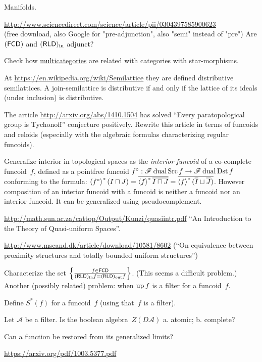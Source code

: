 \documentclass{amsart}
\begin{document}
Manifolds.

\url{http://www.sciencedirect.com/science/article/pii/0304397585900623}\\
(free download, also Google for "pre-adjunction", also "semi" instead of "pre") Are $(\mathsf{FCD})$ and $(\mathsf{RLD})_{\mathrm{in}}$ adjunct?

Check how \href{http://ncatlab.org/nlab/show/multicategory}{multicategories}
are related with categories with star-morphisms.

At \url{https://en.wikipedia.org/wiki/Semilattice} they are defined distributive
semilattices. A join-semilattice is distributive if and only if the lattice of its ideals (under inclusion) is distributive.

The article \url{http://arxiv.org/abs/1410.1504} has solved ``Every paratopological group is Tychonoff'' conjecture positively.
Rewrite this article in terms of funcoids and reloids (especially with the algebraic formulas characterizing regular funcoids).

Generalize interior in topological spaces as the \emph{interior funcoid} of a co-complete funcoid~$f$, defined as a pointfree funcoid
$f^\circ: \mathscr{F}\operatorname{dual}\operatorname{Src} f \rightarrow \mathscr{F}\operatorname{dual}\operatorname{Dst} f$ conforming to the formula:
$\left\langle f^{\circ}\right\rangle ^{\ast} (I \sqcap J) = \overline{\left\langle f\right\rangle ^{\ast} \overline{I \sqcap J}} = \overline{\left\langle f\right\rangle ^{\ast} ( \overline{I} \sqcup \overline{J} )}$.
However composition of an interior funcoid with a funcoid is neither a funcoid nor an interior funcoid.
It can be generalized using pseudocomplement.

\url{http://math.sun.ac.za/cattop/Output/Kunzi/quasiintr.pdf} ``An Introduction to the Theory of Quasi-uniform Spaces''.

\url{http://www.mscand.dk/article/download/10581/8602} (``On equivalence between proximity structures and totally bounded uniform structures'')

Characterize the set $\left\{ \frac{f\in\mathsf{FCD}}{(\mathsf{RLD})_{\mathrm{in}} f=(\mathsf{RLD})_{\mathrm{out}} f}\right\}$. (This seems a difficult problem.)
Another (possibly related) problem: when $\operatorname{up} f$ is a filter for a funcoid~$f$.

Define $S^\ast (f)$ for a funcoid~$f$ (using that~$f$ is a filter).

Let $\mathcal{A}$ be a filter. Is the boolean algebra~$Z(D\mathcal{A})$
a. atomic; b. complete?

Can a function be restored from its generalized limits?

\url{https://arxiv.org/pdf/1003.5377.pdf}
\end{document}
